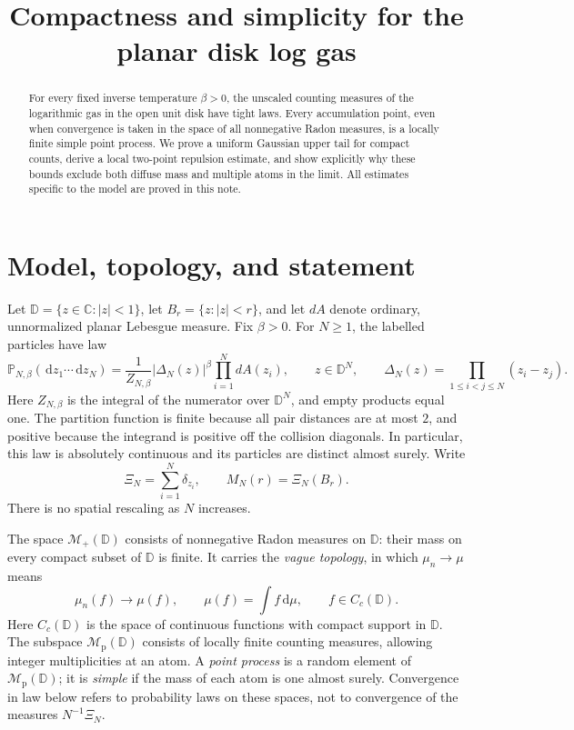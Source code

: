 \documentclass[11pt,a4paper]{article}
\title{Compactness and simplicity for the planar disk log gas}
\author{}
\date{}
\numberwithin{equation}{section}
\theoremstyle{remark}
\newcommand{\D}{\mathbb D}
\newcommand{\Prob}{\mathbb P}
\newcommand{\Mplus}{\mathcal M_+}
\newcommand{\Mp}{\mathcal M_{\mathrm p}}
\newcommand{\dd}{\,\mathrm d}
\begin{document}
\maketitle
\vspace{-2em}
\begin{abstract}
For every fixed inverse temperature $\beta>0$, the unscaled counting
measures of the logarithmic gas in the open unit disk have tight laws.
Every accumulation point, even when convergence is taken in the space
of all nonnegative Radon measures, is a locally finite simple point
process. We prove a uniform Gaussian upper tail for compact counts,
derive a local two-point repulsion estimate, and show explicitly why
these bounds exclude both diffuse mass and multiple atoms in the limit.
All estimates specific to the model are proved in this note.
\end{abstract}

\section{Model, topology, and statement}

Let $\D=\{z\in\mathbb C:|z|<1\}$, let $B_r=\{z:|z|<r\}$, and
let $dA$ denote ordinary, unnormalized planar Lebesgue measure.
Fix $\beta>0$. For $N\ge1$, the labelled particles have law
\begin{equation}\label{eq:model}
 \Prob_{N,\beta}(\dd z_1\cdots\dd z_N)
 =\frac{1}{Z_{N,\beta}}|\Delta_N(z)|^\beta\prod_{i=1}^N dA(z_i),
 \qquad z\in\D^N,
 \qquad \Delta_N(z)=\prod_{1\le i<j\le N}(z_i-z_j).
\end{equation}
Here $Z_{N,\beta}$ is the integral of the numerator over $\D^N$,
and empty products equal one. The partition function is finite because
all pair distances are at most $2$, and positive because the integrand
is positive off the collision diagonals. In particular, this law is
absolutely continuous and its particles are distinct almost surely.
Write
\[
 \Xi_N=\sum_{i=1}^N\delta_{z_i},\qquad M_N(r)=\Xi_N(B_r).
\]
There is no spatial rescaling as $N$ increases.

The space $\Mplus(\D)$ consists of nonnegative Radon measures on
$\D$: their mass on every compact subset of $\D$ is finite.
It carries the \emph{vague topology}, in which $\mu_n\to\mu$ means
\[
 \mu_n(f)\longrightarrow\mu(f),\qquad
 \mu(f)=\int f\dd\mu,\qquad f\in C_c(\D).
\]
Here $C_c(\D)$ is the space of continuous functions with compact
support in $\D$. The subspace $\Mp(\D)$ consists of locally finite
counting measures, allowing integer multiplicities at an atom.
A \emph{point process} is a random element of $\Mp(\D)$; it is
\emph{simple} if the mass of each atom is one almost surely.
Convergence in law below refers to probability laws on these spaces,
not to convergence of the measures $N^{-1}\Xi_N$.
\end{document}
